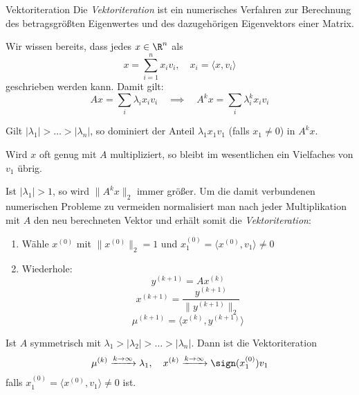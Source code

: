 \begin{defi}{Vektoriteration}
    Die \emph{Vektoriteration} ist ein numerisches Verfahren zur Berechnung des betragsgrößten Eigenwertes und des dazugehörigen Eigenvektors einer Matrix.

    Wir wissen bereits, dass jedes $x \in \R^n$ als
    \[
        x = \sum_{i=1}^{n} x_i v_i, \quad x_i = \langle x, v_i \rangle
    \]
    geschrieben werden kann.
    Damit gilt:
    \[
        Ax = \sum_i \lambda_i x_i v_i \quad \implies \quad A^kx = \sum_i \lambda_i^k x_i v_i
    \]

    Gilt $|\lambda_1| > \dots > |\lambda_n|$, so dominiert der Anteil $\lambda_1 x_1 v_1$ (falls $x_1 \neq 0$) in $A^k x$.

    Wird $x$ oft genug mit $A$ multipliziert, so bleibt im wesentlichen ein Vielfaches von $v_1$ übrig.

    Ist $|\lambda_1| > 1$, so wird $\|A^kx\|_2$ immer größer.
    Um die damit verbundenen numerischen Probleme zu vermeiden normalisiert man nach jeder Multiplikation mit $A$ den neu berechneten Vektor und erhält somit die \emph{Vektoriteration}:
    \begin{enumerate}
        \item Wähle $x^{(0)}$ mit $\|x^{(0)}\|_2 = 1$ und $x_1^{(0)} = \langle x^{(0)}, v_1 \rangle \neq 0$
        \item Wiederhole:
              \[
                  y^{(k+1)} = A x^{(k)}
              \]
              \[
                  x^{(k+1)} = \frac{y^{(k+1)}}{ \| y^{(k+1)} \|_2 }
              \]
              \[
                  \mu^{(k+1)} = \langle x^{(k)}, y^{(k+1)} \rangle
              \]
    \end{enumerate}

    Ist $A$ symmetrisch mit $\lambda_1 > |\lambda_2| > \dots > |\lambda_n|$.
    Dann ist die Vektoriteration
    \[
        \mu^{(k)} \xrightarrow{k \to \infty} \lambda_1, \quad x^{(k)} \xrightarrow{k \to \infty} \sign(x_1^{(0)}) v_1
    \]
    falls $x_1^{(0)} = \langle x^{(0)}, v_1 \rangle \neq 0$ ist.
\end{defi}

